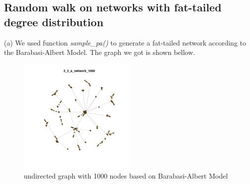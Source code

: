 \documentclass[draftcls,12pt,onecolumn]{IEEEtran}
\begin{document}
\subsection{Random walk on networks with fat-tailed degree distribution}
(a) We used function \emph{sample\_pa()} to generate a fat-tailed network according to the Barabasi-Albert Model. The graph we got is shown bellow.
\begin{figure}[H]
\centering
\includegraphics[width=0.5\textwidth]{2_2_a_network_1000}
\caption{undirected graph with 1000 nodes based on Barabasi-Albert Model}
\label{fig09}
\end{figure}
\end{document}
